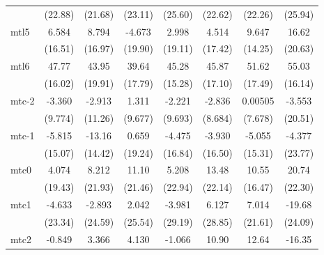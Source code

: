 \documentclass{article}
\begin{document}
{\begin{longtable}{l*{7}{c}}
                &  (22.88)         &  (21.68)         &  (23.11)         &  (25.60)         &  (22.62)         &  (22.26)         &  (25.94)         \\
mtl5            &    6.584         &    8.794         &   -4.673         &    2.998         &    4.514         &    9.647         &    16.62         \\
                &  (16.51)         &  (16.97)         &  (19.90)         &  (19.11)         &  (17.42)         &  (14.25)         &  (20.63)         \\
mtl6            &    47.77\sym{*}  &    43.95         &    39.64         &    45.28\sym{*}  &    45.87\sym{*}  &    51.62\sym{*}  &    55.03\sym{*}  \\
                &  (16.02)         &  (19.91)         &  (17.79)         &  (15.28)         &  (17.10)         &  (17.49)         &  (16.14)         \\
mtc-2           &   -3.360         &   -2.913         &    1.311         &   -2.221         &   -2.836         &  0.00505         &   -3.553         \\
                &  (9.774)         &  (11.26)         &  (9.677)         &  (9.693)         &  (8.684)         &  (7.678)         &  (20.51)         \\
mtc-1           &   -5.815         &   -13.16         &    0.659         &   -4.475         &   -3.930         &   -5.055         &   -4.377         \\
                &  (15.07)         &  (14.42)         &  (19.24)         &  (16.84)         &  (16.50)         &  (15.31)         &  (23.77)         \\
mtc0            &    4.074         &    8.212         &    11.10         &    5.208         &    13.48         &    10.55         &    20.74         \\
                &  (19.43)         &  (21.93)         &  (21.46)         &  (22.94)         &  (22.14)         &  (16.47)         &  (22.30)         \\
mtc1            &   -4.633         &   -2.893         &    2.042         &   -3.981         &    6.127         &    7.014         &   -19.68         \\
                &  (23.34)         &  (24.59)         &  (25.54)         &  (29.19)         &  (28.85)         &  (21.61)         &  (24.09)         \\
mtc2            &   -0.849         &    3.366         &    4.130         &   -1.066         &    10.90         &    12.64         &   -16.35         \\

\end{longtable}}
\end{document}
